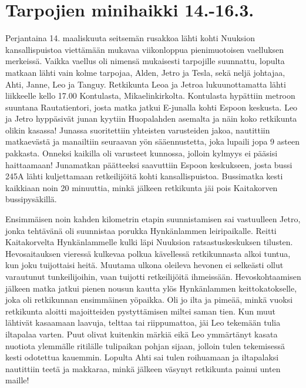 \section{Tarpojien minihaikki 14.-16.3.}

\begin{multicols}{2}

Perjantaina 14. maaliskuuta seitsemän rusakkoa lähti kohti Nuuksion kansallispuistoa viettämään mukavaa viikonloppua pienimuotoisen vaelluksen merkeissä. Vaikka vaellus oli nimensä mukaisesti tarpojille suunnattu, lopulta matkaan lähti vain kolme tarpojaa, Alden, Jetro ja Tesla, sekä neljä johtajaa, Ahti, Janne, Leo ja Tanguy. Retkikunta Leoa ja Jetroa lukuunottamatta lähti liikkeelle kello 17.00 Kontulasta, Mikaelinkirkolta. Kontulasta hypättiin metroon suuntana Rautatientori, josta matka jatkui E-junalla kohti Espoon keskusta. Leo ja Jetro hyppäsivät junan kyytiin Huopalahden asemalta ja näin koko retkikunta olikin kasassa! Junassa suoritettiin yhteisten varusteiden jakoa, nautittiin matkaevästä ja manailtiin seuraavan yön sääennustetta, joka lupaili jopa 9 asteen pakkasta. Onneksi kaikilla oli varusteet kunnossa, jolloin kylmyys ei pääsisi haittaamaan! Junamatkan päätteeksi saavuttiin Espoon keskukseen, josta bussi 245A lähti kuljettamaan retkeilijöitä kohti kansallispuistoa. Bussimatka kesti kaikkiaan noin 20 minuuttia, minkä jälkeen retkikunta jäi pois Kaitakorven bussipysäkillä. 

Ensimmäisen noin kahden kilometrin etapin suunnistamisen sai vastuulleen Jetro, jonka tehtävänä oli suunnistaa porukka Hynkänlammen leiripaikalle. Reitti Kaitakorvelta Hynkänlammelle kulki läpi Nuuksion ratsastuskeskuksen tilusten. Hevosaitauksen vieressä kulkevaa polkua kävellessä retkikunnasta alkoi tuntua, kun joku tuijottaisi heitä. Muutama ulkona oleileva hevonen ei selkeästi ollut varautunut tunkeilijoihin, vaan tuijotti retkeilijöitä ihmeissään. Hevoskohtaamisen jälkeen matka jatkui pienen nousun kautta ylös Hynkänlammen keittokatokselle, joka oli retkikunnan ensimmäinen yöpaikka. Oli jo ilta ja pimeää, minkä vuoksi retkikunta aloitti majoitteiden pystyttämisen miltei saman tien. Kun muut lähtivät kasaamaan laavuja, telttaa tai riippumattoa, jäi Leo tekemään tulia iltapalaa varten. Puut olivat kuitenkin märkiä eikä Leo ymmärtänyt kasata nuotiota ylemmälle ritilälle tulipaikan pohjan sijaan, jolloin tulen tekemisessä kesti odotettua kauemmin. Lopulta Ahti sai tulen roihuamaan ja iltapalaksi nautittiin teetä ja makkaraa, minkä jälkeen väsynyt retkikunta painui unten maille!


\end{multicols}
